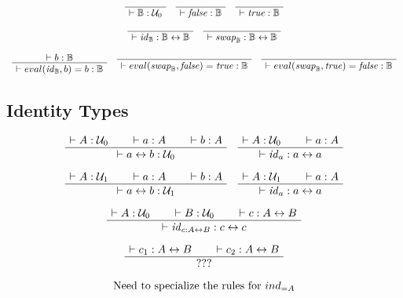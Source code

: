 \documentclass[format=acmlarge,review,natbib]{acmart}
\newcommand{\evalone}[2]{eval(#1,#2)}
\newcommand{\idc}{\mathit{id}}
\newcommand{\swapc}{\mathit{swap}}
\newcommand{\iso}{\leftrightarrow}
\newcommand{\fc}{\mathit{false}}
\newcommand{\tc}{\mathit{true}}
\newcommand{\boolt}{\mathbb{B}}
\newcommand{\uzero}{\mathcal{U}_0}
\newcommand{\uone}{\mathcal{U}_1}
\newcommand{\proves}{\vdash}
\newcommand{\jdg}[2]{\proves #1 : #2}
\begin{document}
\[
  \begin{array}{c}
    \AxiomC{}
    \UnaryInfC{$\jdg{\boolt}{\uzero}$}
    \DisplayProof
    \quad
    \AxiomC{}
    \UnaryInfC{$\jdg{\fc}{\boolt}$}
    \DisplayProof
    \quad
    \AxiomC{}
    \UnaryInfC{$\jdg{\tc}{\boolt}$}
    \DisplayProof
    \\
    \\
    \AxiomC{}
    \UnaryInfC{$\jdg{\idc_{\boolt}}{\boolt\iso\boolt}$}
    \DisplayProof
    \quad
    \AxiomC{}
    \UnaryInfC{$\jdg{\swapc_{\boolt}}{\boolt\iso\boolt}$}
    \DisplayProof
    \\
    \\
    \AxiomC{$\jdg{b}{\boolt}$}
    \UnaryInfC{$\jdg{\evalone{\idc_{\boolt}}{b} = b}{\boolt}$}
    \DisplayProof
    \quad
    \AxiomC{}
    \UnaryInfC{$\jdg{\evalone{\swapc_{\boolt}}{\fc} = \tc}{\boolt}$}
    \DisplayProof
    \quad
    \AxiomC{}
    \UnaryInfC{$\jdg{\evalone{\swapc_{\boolt}}{\tc} = \fc}{\boolt}$}
    \DisplayProof
  \end{array}
\]

\subsection{Identity Types}

\[
  \begin{array}{c}
    \AxiomC{$\jdg{A}{\uzero}$}
    \AxiomC{$\jdg{a}{A}$}
    \AxiomC{$\jdg{b}{A}$}
    \TrinaryInfC{$\jdg{a \iso b}{\uzero}$}
    \DisplayProof
    \quad
    \AxiomC{$\jdg{A}{\uzero}$}
    \AxiomC{$\jdg{a}{A}$}
    \BinaryInfC{$\jdg{\idc_{a}}{a \iso a}$}
    \DisplayProof
    \\
    \\
    \AxiomC{$\jdg{A}{\uone}$}
    \AxiomC{$\jdg{a}{A}$}
    \AxiomC{$\jdg{b}{A}$}
    \TrinaryInfC{$\jdg{a \iso b}{\uone}$}
    \DisplayProof
    \quad
    \AxiomC{$\jdg{A}{\uone}$}
    \AxiomC{$\jdg{a}{A}$}
    \BinaryInfC{$\jdg{\idc_{a}}{a \iso a}$}
    \DisplayProof
    \\
    \\
    \AxiomC{$\jdg{A}{\uzero}$}
    \AxiomC{$\jdg{B}{\uzero}$}
    \AxiomC{$\jdg{c}{A \iso B}$}
    \TrinaryInfC{$\jdg{\idc_{c:A\iso B}}{c \iso c}$}
    \DisplayProof
    \\
    \\
    \AxiomC{$\jdg{c_1}{A \iso B}$}
    \AxiomC{$\jdg{c_2}{A \iso B}$}
    \BinaryInfC{$???$}
    \DisplayProof
    \\
    \\
    \mbox{Need to specialize the rules for } ind_{=A}
  \end{array}
\]
\end{document}
